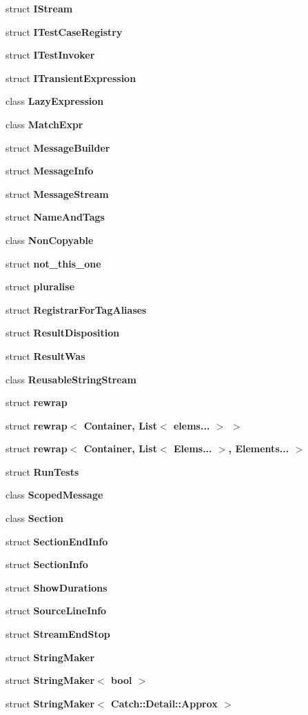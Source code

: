 \begin{DoxyCompactItemize}
\item 
struct \textbf{ I\+Stream}
\item 
struct \textbf{ I\+Test\+Case\+Registry}
\item 
struct \textbf{ I\+Test\+Invoker}
\item 
struct \textbf{ I\+Transient\+Expression}
\item 
class \textbf{ Lazy\+Expression}
\item 
class \textbf{ Match\+Expr}
\item 
struct \textbf{ Message\+Builder}
\item 
struct \textbf{ Message\+Info}
\item 
struct \textbf{ Message\+Stream}
\item 
struct \textbf{ Name\+And\+Tags}
\item 
class \textbf{ Non\+Copyable}
\item 
struct \textbf{ not\+\_\+this\+\_\+one}
\item 
struct \textbf{ pluralise}
\item 
struct \textbf{ Registrar\+For\+Tag\+Aliases}
\item 
struct \textbf{ Result\+Disposition}
\item 
struct \textbf{ Result\+Was}
\item 
class \textbf{ Reusable\+String\+Stream}
\item 
struct \textbf{ rewrap}
\item 
struct \textbf{ rewrap$<$ Container, List$<$ elems... $>$ $>$}
\item 
struct \textbf{ rewrap$<$ Container, List$<$ Elems... $>$, Elements... $>$}
\item 
struct \textbf{ Run\+Tests}
\item 
class \textbf{ Scoped\+Message}
\item 
class \textbf{ Section}
\item 
struct \textbf{ Section\+End\+Info}
\item 
struct \textbf{ Section\+Info}
\item 
struct \textbf{ Show\+Durations}
\item 
struct \textbf{ Source\+Line\+Info}
\item 
struct \textbf{ Stream\+End\+Stop}
\item 
struct \textbf{ String\+Maker}
\item 
struct \textbf{ String\+Maker$<$ bool $>$}
\item 
struct \textbf{ String\+Maker$<$ Catch\+::\+Detail\+::\+Approx $>$}

\end{DoxyCompactItemize}
